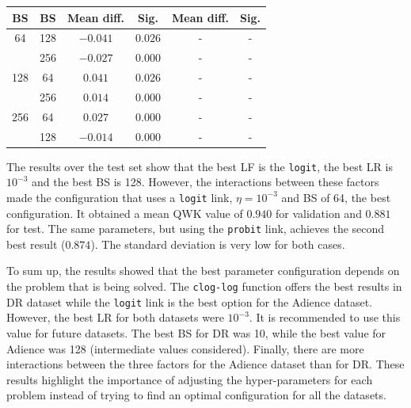 \documentclass[journal]{IEEEtran}
\begin{document}
\begin{table}[!t]
{\begin{tabular}{cccccc}
			       BS         &        BS         & Mean diff. &        Sig.        & Mean diff. &          Sig.           \\ \hline
			       64         &        128        &  $-0.041$  &      $0.026$       &     -      &            -            \\
			                  &        256        &  $-0.027$  &      $0.000$       &     -      &            -            \\
			       128        &        64         &  $0.041$   &      $0.026$       &     -      &            -            \\
			                  &        256        &  $0.014$   &      $0.000$       &     -      &            -            \\
			       256        &        64         &  $0.027$   &      $0.000$       &     -      &            -            \\
			                  &        128        &  $-0.014$  &      $0.000$       &     -      &            -\\\hline\hline
		\end{tabular}}
	\end{table}
		
	The results over the test set show that the best LF is the \texttt{logit}, the best LR is $10^{-3}$ and the best BS is 128. However, the interactions between these factors made the configuration that uses a \texttt{logit} link, $\eta=10^{-3}$ and BS of 64, the best configuration. It obtained a mean QWK value of $0.940$ for validation and $0.881$ for test. The same parameters, but using the \texttt{probit} link, achieves the second best result ($0.874$). The standard deviation is very low for both cases.
	
	To sum up, the results showed that the best parameter configuration depends on the problem that is being solved. The \texttt{clog-log} function offers the best results in DR dataset while the \texttt{logit} link is the best option for the Adience dataset. However, the best LR for both datasets were $10^{-3}$. It is recommended to use this value for future datasets. The best BS for DR was 10, while the best value for Adience was 128 (intermediate values considered). Finally, there are more interactions between the three factors for the Adience dataset than for DR. These results highlight the importance of adjusting the hyper-parameters for each problem instead of trying to find an optimal configuration for all the datasets. 
	
\end{document}
